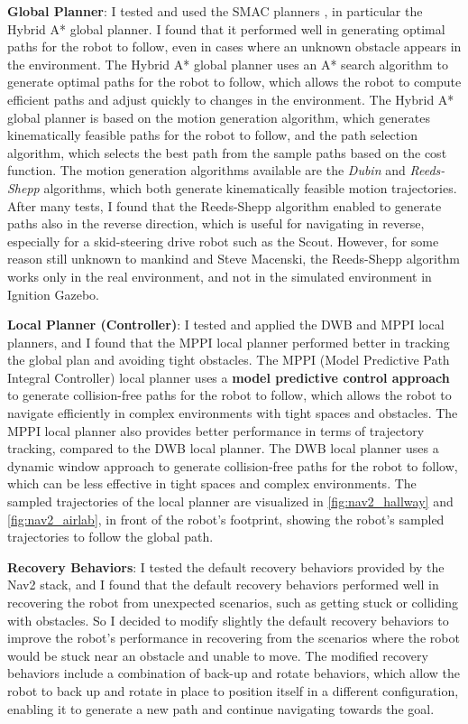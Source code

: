 \textbf{Global Planner}:
I tested and used the SMAC planners \cite{macenski2024smac}, in particular the Hybrid A* global planner.
I found that it performed well in generating optimal paths
for the robot to follow, even in cases where an unknown obstacle appears in the environment. The Hybrid A*
global planner uses an A* search algorithm to generate optimal paths for the robot to follow, which allows the robot
to compute efficient paths and adjust quickly to changes in the environment. The Hybrid A* global planner is based on
the motion generation algorithm, which generates kinematically feasible paths for the robot to follow, and the path selection
algorithm, which selects the best path from the sample paths based on the cost function.
The motion generation algorithms available are the \textit{Dubin} and \textit{Reeds-Shepp} algorithms, which both generate
kinematically feasible motion trajectories. After many tests, I found that the Reeds-Shepp algorithm enabled
to generate paths also in the reverse direction, which is useful for navigating in reverse, especially for
a skid-steering drive robot such as the Scout. However, for some reason still unknown to mankind and Steve Macenski,
the Reeds-Shepp algorithm works only in the real environment, and not in the simulated environment in Ignition Gazebo.

\textbf{Local Planner (Controller)}:
I tested and applied the DWB and MPPI local planners, and I found that the MPPI local planner performed better
in tracking the global plan and avoiding tight obstacles. The MPPI (Model Predictive Path Integral Controller) 
\cite{mppicontroller} local planner uses a \textbf{model predictive control approach}
to generate collision-free paths for the robot to follow, which allows the robot to navigate efficiently in complex
environments with tight spaces and obstacles. The MPPI local planner also provides better performance in terms of
trajectory tracking, compared to the DWB local planner. The DWB local planner uses a dynamic window approach to generate
collision-free paths for the robot to follow, which can be less effective in tight spaces and complex environments.
The sampled trajectories of the local planner are visualized in \ref{fig:nav2_hallway} and \ref{fig:nav2_airlab},
in front of the robot's footprint, showing the robot's sampled trajectories to follow the global path.

\textbf{Recovery Behaviors}:
I tested the default recovery behaviors provided by the Nav2 stack, and I found that the default recovery behaviors
performed well in recovering the robot from unexpected scenarios, such as getting stuck or colliding with obstacles.
So I decided to modify slightly the default recovery behaviors to improve the robot's performance in recovering
from the scenarios where the robot would be stuck near an obstacle and unable to move. The modified recovery behaviors
include a combination of back-up and rotate behaviors, which allow the robot to back up and rotate in place to position
itself in a different configuration, enabling it to generate a new path and continue navigating towards the goal.

